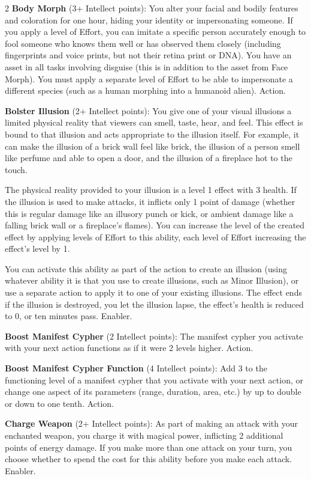 \begin{multicols}{2}
\textbf{Body Morph} (3+ Intellect points): You alter your facial and bodily features and coloration for one hour, hiding your identity or impersonating someone. If you apply a level of Effort, you can imitate a specific person accurately enough to fool someone who knows them well or has observed them closely (including fingerprints and voice prints, but not their retina print or DNA). You have an asset in all tasks involving disguise (this is in addition to the asset from Face Morph). You must apply a separate level of Effort to be able to impersonate a different species (such as a human morphing into a humanoid alien). Action.

\textbf{Bolster Illusion} (2+ Intellect points): You give one of your visual illusions a limited physical reality that viewers can smell, taste, hear, and feel. This effect is bound to that illusion and acts appropriate to the illusion itself. For example, it can make the illusion of a brick wall feel like brick, the illusion of a person smell like perfume and able to open a door, and the illusion of a fireplace hot to the touch.

The physical reality provided to your illusion is a level 1 effect with 3 health. If the illusion is used to make attacks, it inflicts only 1 point of damage (whether this is regular damage like an illusory punch or kick, or ambient damage like a falling brick wall or a fireplace’s flames). You can increase the level of the created effect by applying levels of Effort to this ability, each level of Effort increasing the effect’s level by 1.

You can activate this ability as part of the action to create an illusion (using whatever ability it is that you use to create illusions, such as Minor Illusion), or use a separate action to apply it to one of your existing illusions. The effect ends if the illusion is destroyed, you let the illusion lapse, the effect’s health is reduced to 0, or ten minutes pass. Enabler.

\textbf{Boost Manifest Cypher} (2 Intellect points): The manifest cypher you activate with your next action functions as if it were 2 levels higher. Action.

\textbf{Boost Manifest Cypher Function} (4 Intellect points): Add 3 to the functioning level of a manifest cypher that you activate with your next action, or change one aspect of its parameters (range, duration, area, etc.) by up to double or down to one tenth. Action.

\textbf{Charge Weapon} (2+ Intellect points): As part of making an attack with your enchanted weapon, you charge it with magical power, inflicting 2 additional points of energy damage. If you make more than one attack on your turn, you choose whether to spend the cost for this ability before you make each attack. Enabler.


\end{multicols}
